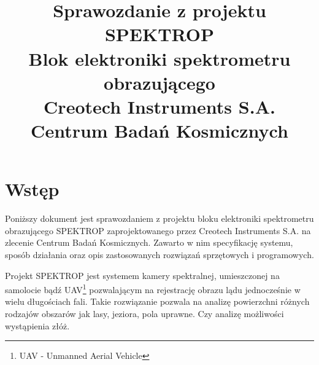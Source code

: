 \documentclass[a4paper,11pt,oneside]{article}  %
\title{Sprawozdanie z projektu SPEKTROP\\ Blok elektroniki spektrometru obrazującego \\[10pt] \large{Creotech Instruments S.A.} \\ \large{Centrum Badań Kosmicznych}}
\begin{document}
%





\maketitle



\lstset{escapechar=@,style=custom}

\tableofcontents
\newpage	
\section{Wstęp} 
Poniższy dokument jest sprawozdaniem z projektu bloku elektroniki spektrometru obrazującego SPEKTROP zaprojektowanego przez Creotech Instruments S.A. na zlecenie Centrum Badań Kosmicznych. Zawarto w nim specyfikację systemu, sposób działania oraz opis zastosowanych rozwiązań sprzętowych i programowych. 

Projekt SPEKTROP jest systemem kamery spektralnej, umieszczonej na samolocie bądź UAV\footnote{UAV - Unmanned Aerial Vehicle} pozwalającym na rejestrację obrazu lądu jednocześnie w wielu długościach fali.
Takie rozwiązanie pozwala na analizę powierzchni różnych rodzajów obszarów jak lasy, jeziora, pola uprawne. Czy analizę możliwości wystąpienia złóż.
\end{document}
